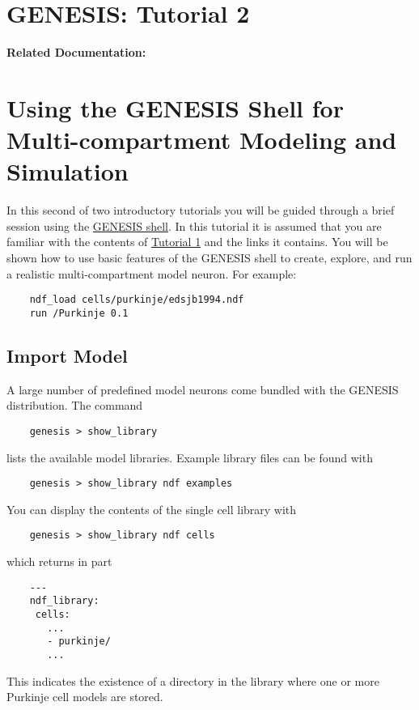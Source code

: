 \documentclass[12pt]{article}
\begin{document}
\section*{GENESIS: Tutorial 2}

{\bf Related Documentation:}

\section*{Using the GENESIS Shell for\\Multi-compartment Modeling and Simulation}

In this second of two introductory tutorials you will be guided through a brief session using the \href{../gshell/gshell.tex}{GENESIS shell}. In this tutorial it is assumed that you are familiar with the contents of \href{../tutorial1/tutorial1.tex}{Tutorial 1} and the links it contains. You will be shown how to use basic features of the GENESIS shell to create, explore, and run a realistic multi-compartment model neuron. For example:
\begin{verbatim}
    ndf_load cells/purkinje/edsjb1994.ndf
    run /Purkinje 0.1
\end{verbatim}

\subsection*{Import Model}

A large number of predefined model neurons come bundled with the GENESIS distribution. The command
\begin{verbatim}
    genesis > show_library
\end{verbatim}
lists the available model libraries. Example library files can be found with
\begin{verbatim}
    genesis > show_library ndf examples
\end{verbatim}
You can display the contents of the single cell library with
\begin{verbatim}
    genesis > show_library ndf cells
\end{verbatim}
which returns in part
\begin{verbatim}
    ---
    ndf_library:
     cells:
       ...
       - purkinje/
       ...
\end{verbatim}
This indicates the existence of a directory in the library where one or more Purkinje cell models are stored.
\end{document}
